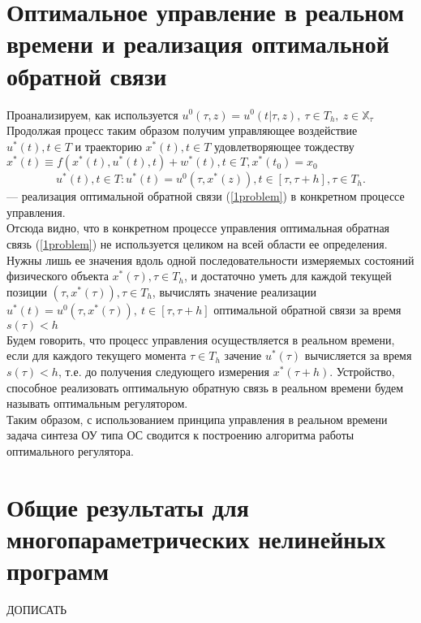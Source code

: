 \section{Оптимальное управление в реальном времени и реализация оптимальной обратной связи}\label{1sec:real-time}
Проанализируем, как используется $u^0(\tau,z) = u^0(t|\tau,z),\ \tau\in T_h,\ z\in \mathbb{X_\tau}$\\
Продолжая процесс таким образом получим управляющее воздействие $u^*(t), t\in T$ и траекторию $x^*(t), t\in T$ удовлетворяющее тождеству
$x^*(t) \equiv f(x^*(t), u^*(t), t) + w^*(t), t\in T, x^*(t_0) = x_0$
\begin{equation} \label{9problem}
    u^*(t), t\in T: u^*(t) = u^0(\tau,x^*(z)), t\in [\tau, \tau + h], \tau\in T_h.
     \end{equation}
--- реализация оптимальной обратной связи (\ref{1problem}) в конкретном процессе управления.\\
Отсюда видно, что в конкретном процессе управления оптимальная обратная связь (\ref{1problem}) не используется целиком на всей области ее определения.
Нужны лишь ее значения вдоль одной последовательности измеряемых состояний физического объекта $x^*(\tau), \tau\in T_h$, и достаточно уметь
для каждой текущей позиции $(\tau,x^*(\tau)), \tau\in T_h$, вычислять значение реализации 
$u^*(t) = u^0(\tau, x^*(\tau)),\ t\in [\tau, \tau + h]$ оптимальной обратной связи за время $s(\tau)<h$\\
Будем говорить, что процесс управления осуществляется в реальном времени, если для каждого текущего момента $\tau\in T_h$ зачение $u^*(\tau)$
вычисляется за время $s(\tau)<h$, т.е. до получения следующего измерения $x^*(\tau+h)$. Устройство, способное реализовать оптимальную обратную связь в реальном времени
будем называть оптимальным регулятором.\\
Таким образом, с использованием принципа управления в реальном времени задача синтеза ОУ типа ОС сводится к построению алгоритма работы оптимального регулятора.


\section{Общие результаты для многопараметрических нелинейных программ}\label{2sec:results-multy-parametric}

ДОПИСАТЬ